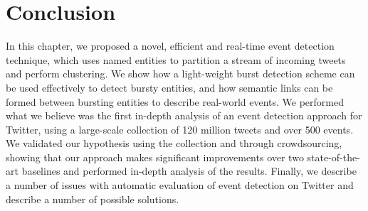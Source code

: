 
\section{Conclusion}
In this chapter, we proposed a novel, efficient and real-time event detection technique, which uses named entities to partition a stream of incoming tweets and perform clustering.
We show how a light-weight burst detection scheme can be used effectively to detect bursty entities, and how semantic links can be formed between bursting entities to describe real-world events.
We performed what we believe was the first in-depth analysis of an event detection approach for Twitter, using a large-scale collection of 120 million tweets and over 500 events.
We validated our hypothesis using the collection and through crowdsourcing, showing that our approach makes significant improvements over two state-of-the-art baselines and performed in-depth analysis of the results.
Finally, we describe a number of issues with automatic evaluation of event detection on Twitter and describe a number of possible solutions.
